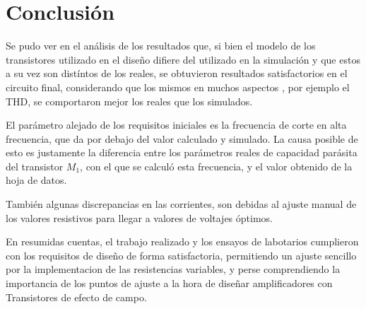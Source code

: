 \section{Conclusión}

Se pudo ver en el análisis de los resultados que, si bien el modelo de los transistores utilizado en el diseño difiere del utilizado en la simulación y que estos a su vez son distíntos de los reales, se obtuvieron resultados satisfactorios en el circuito final, considerando que los mismos en muchos aspectos , por ejemplo el THD, se comportaron mejor los reales que los simulados.

El parámetro alejado de los requisitos iniciales es la frecuencia de corte en alta frecuencia, que da por debajo del valor calculado y simulado. La causa posible de esto es justamente la diferencia entre los parámetros reales de capacidad parásita del transistor $M_1$, con el que se calculó esta frecuencia, y el valor obtenido de la hoja de datos.

También algunas discrepancias en las corrientes, son debidas al ajuste manual de los valores resistivos para llegar a valores de voltajes óptimos.

En resumidas cuentas, el trabajo realizado y los ensayos de labotarios cumplieron con los requisitos de diseño de forma satisfactoria, permitiendo un ajuste sencillo por la implementacion de las resistencias variables, y perse comprendiendo la importancia de los puntos de ajuste a la hora de diseñar amplificadores con Transistores de efecto de campo.

